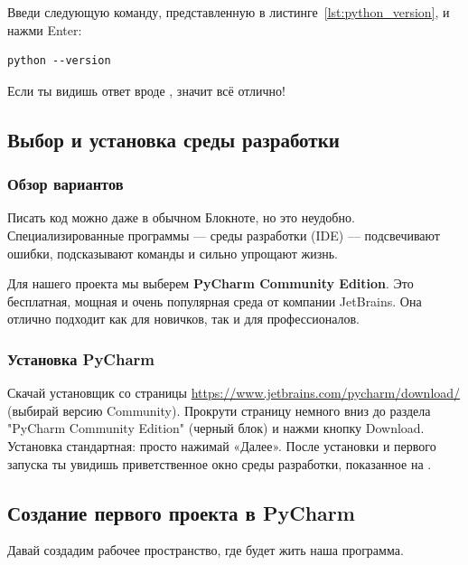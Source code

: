 Введи следующую команду, представленную в листинге~\ref{lst:python_version}, и нажми Enter:

\begin{listing}[H]
	\caption{Проверка версии Python}\label{lst:python_version}
	\begin{verbatim}
python --version
	\end{verbatim}
\end{listing}



Если ты видишь ответ вроде , значит всё отлично!

\subsection{Выбор и установка среды разработки}
\subsubsection{Обзор вариантов}

Писать код можно даже в обычном Блокноте, но это неудобно. Специализированные программы — среды разработки (IDE) — подсвечивают ошибки, подсказывают команды и сильно упрощают жизнь. 

Для нашего проекта мы выберем \textbf{PyCharm Community Edition}. Это бесплатная, мощная и очень популярная среда от компании JetBrains. Она отлично подходит как для новичков, так и для профессионалов.

\subsubsection{Установка PyCharm}

Скачай установщик со страницы \url{https://www.jetbrains.com/pycharm/download/} (выбирай версию Community). Прокрути страницу немного вниз до раздела "PyCharm Community Edition" (черный блок) и нажми кнопку Download. Установка стандартная: просто нажимай «Далее». После установки и первого запуска ты увидишь приветственное окно среды разработки, показанное на .


\subsection{Создание первого проекта в PyCharm}

Давай создадим рабочее пространство, где будет жить наша программа.

